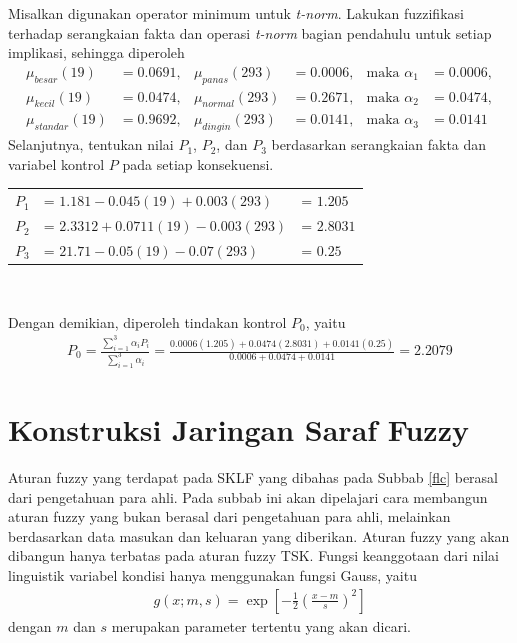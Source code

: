 \begin{contoh}
\noindent Misalkan digunakan operator minimum untuk \emph{t-norm}. Lakukan fuzzifikasi terhadap serangkaian fakta dan operasi \emph{t-norm} bagian pendahulu untuk setiap implikasi, sehingga diperoleh
\begin{align*}
    \mu_{besar}(19) &= \num{0,0691}, & \mu_{panas}(293) &= \num{0,0006}, &\text{maka } \alpha_1&= \num{0,0006},\\
    \mu_{kecil}(19) &= \num{0,0474}, & \mu_{normal}(293) &= \num{0,2671},&\text{maka } \alpha_2&= \num{0,0474},\\
    \mu_{standar}(19) &= \num{0,9692}, & \mu_{dingin}(293)&= \num{0,0141},&\text{maka } \alpha_3&= \num{0,0141}
\end{align*}
Selanjutnya, tentukan nilai $P_1$, $P_2$, dan $P_3$ berdasarkan serangkaian fakta dan variabel kontrol $P$ pada setiap konsekuensi.
\begin{center}
    \begin{tabular}{rll}
        $P_1$ &= $\num{1,181} - \num{0,045}(19) + \num{0,003}(293)$ &= $\num{1,205}$\\
        $P_2$ &= $\num{2,3312} + \num{0,0711}(19) - \num{0,003}(293)$ &= $\num{2,8031}$\\
        $P_3$ &= $\num{21,71} - \num{0,05}(19)  - \num{0,07}(293)$ &= $\num{0,25}$
    \end{tabular}\\
\end{center}
Dengan demikian, diperoleh tindakan kontrol $P_0$, yaitu
\begin{align*}
    P_0 = \displaystyle \frac{\displaystyle\sum_{i=1}^3 \alpha_i P_i}{\displaystyle\sum_{i=1}^3 \alpha_i}
    = \displaystyle \frac{\num{0,0006}(\num{1,205})+\num{0,0474}(\num{2,8031}) + \num{0,0141}(\num{0,25})}{\num{0,0006}+\num{0,0474} + \num{0,0141}}
    = \num{2,2079}
\end{align*}
\end{contoh}

\section{Konstruksi Jaringan Saraf Fuzzy} \label{konst fnn}
\noindent Aturan fuzzy yang terdapat pada SKLF yang dibahas pada Subbab \ref{flc} berasal dari pengetahuan para ahli. Pada subbab ini akan dipelajari cara membangun aturan fuzzy yang bukan berasal dari pengetahuan para ahli, melainkan berdasarkan data masukan dan keluaran yang diberikan. Aturan fuzzy yang akan dibangun hanya terbatas pada aturan fuzzy TSK. Fungsi keanggotaan dari nilai linguistik variabel kondisi hanya menggunakan fungsi Gauss, yaitu
\begin{align} \label{gauss}
    g(x; m,s) = \displaystyle \exp \left[ -\displaystyle \frac{1}{2}\left( \displaystyle \frac{x-m}{s} \right)^2 \right]
\end{align}
dengan $m$ dan $s$ merupakan parameter tertentu yang akan dicari.

